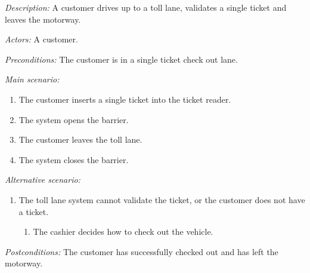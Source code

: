 \textit{Description: } A customer drives up to a toll lane, validates a single ticket and leaves the motorway. 

\textit{Actors:} A customer.

\textit{Preconditions: } The customer is in a single ticket check out lane. 

\textit{Main scenario: }
\begin{enumerate}
\item The customer inserts a single ticket into the ticket reader.
\item The system opens the  barrier.
\item The customer leaves the toll lane.
\item The system closes the barrier.
\end{enumerate}
\textit{Alternative scenario:}
\begin{enumerate}
\item The toll lane system cannot validate the ticket, or the customer does not have a ticket.
\begin{enumerate}
\item The cashier decides how to check out the vehicle.
\end{enumerate}
\end{enumerate}
\textit{Postconditions:}
The customer has successfully checked out and has left the motorway.
